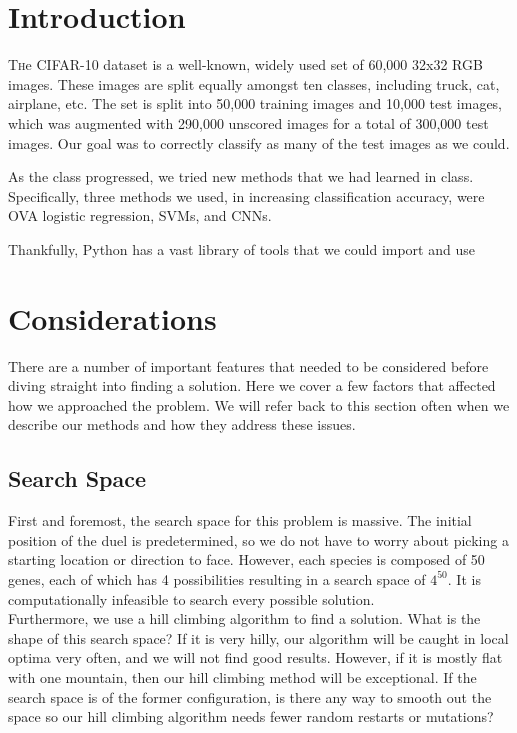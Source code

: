 \documentclass[twoside]{article}
\begin{document}
\begin{multicols}{2} %

\section{Introduction}

\lettrine[nindent=0em,lines=3]{T}he CIFAR-10 dataset is a well-known, widely used set of 60,000 32x32 RGB images. These images are split equally amongst ten classes, including truck, cat, airplane, etc. The set is split into 50,000 training images and 10,000 test images, which was augmented with 290,000 unscored images for a total of 300,000 test images. Our goal was to correctly classify as many of the test images as we could. 

\indent As the class progressed, we tried new methods that we had learned in class. Specifically, three methods we used, in increasing classification accuracy, were OVA logistic regression, SVMs, and CNNs. 

\indent Thankfully, Python has a vast library of tools that we could import and use



\section{Considerations}
There are a number of important features that needed to be considered before diving straight into finding a solution. Here we cover a few factors that affected how we approached the problem. We will refer back to this section often when we describe our methods and how they address these issues.

\subsection{Search Space}
First and foremost, the search space for this problem is massive. The initial position of the duel is predetermined, so we do not have to worry about picking a starting location or direction to face. However, each species is composed of 50 genes, each of which has 4 possibilities resulting in a search space of $4^{50}$. It is computationally infeasible to search every possible solution. 
\\\indent Furthermore, we use a hill climbing algorithm to find a solution. What is the shape of this search space? If it is very hilly, our algorithm will be caught in local optima very often, and we will not find good results. However, if it is mostly flat with one mountain, then our hill climbing method will be exceptional. If the search space is of the former configuration, is there any way to smooth out the space so our hill climbing algorithm needs fewer random restarts or mutations?

\end{multicols}
\end{document}
